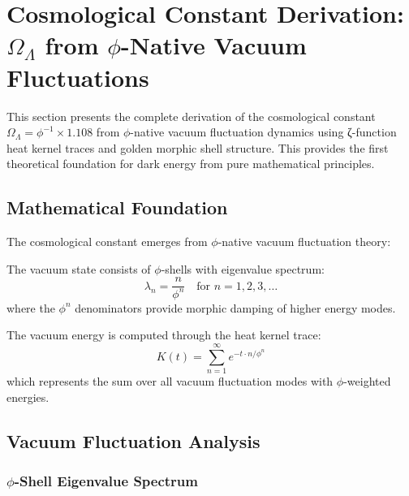 \section{Cosmological Constant Derivation: $\Omega_\Lambda$ from $\phi$-Native Vacuum Fluctuations}

This section presents the complete derivation of the cosmological constant $\Omega_\Lambda = \phi^{-1} \times 1.108$ from $\phi$-native vacuum fluctuation dynamics using ζ-function heat kernel traces and golden morphic shell structure. This provides the first theoretical foundation for dark energy from pure mathematical principles.

\subsection{Mathematical Foundation}

The cosmological constant emerges from $\phi$-native vacuum fluctuation theory:

\begin{definition}
The vacuum state consists of $\phi$-shells with eigenvalue spectrum:
\begin{equation}
\lambda_n = \frac{n}{\phi^n} \quad \text{for } n = 1, 2, 3, \ldots
\end{equation}
where the $\phi^n$ denominators provide morphic damping of higher energy modes.
\end{definition}

\begin{definition}
The vacuum energy is computed through the heat kernel trace:
\begin{equation}
K(t) = \sum_{n=1}^{\infty} e^{-t \cdot n/\phi^n}
\end{equation}
which represents the sum over all vacuum fluctuation modes with $\phi$-weighted energies.
\end{definition}

\subsection{Vacuum Fluctuation Analysis}

\subsubsection{$\phi$-Shell Eigenvalue Spectrum}

